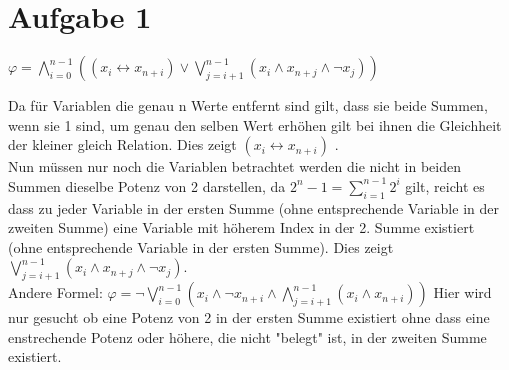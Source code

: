 \section*{Aufgabe 1}


$\varphi = \bigwedge_{i=0}^{n-1}((x_i \leftrightarrow x_{n+i}) \vee \bigvee_{j=i+1}^{n-1}( x_i \wedge x_{n+j} \wedge \neg x_{j}))$ 



Da für Variablen die genau n Werte entfernt sind gilt, dass sie beide Summen, wenn sie 1 sind, um genau den selben Wert erhöhen gilt bei ihnen die Gleichheit der kleiner gleich Relation. Dies zeigt $(x_i \leftrightarrow x_{n+i})$ .\\


Nun müssen nur noch die Variablen betrachtet werden die nicht in beiden Summen dieselbe Potenz von 2 darstellen, da $2^n-1 = \sum_{i=1}^{n-1}2^i$ gilt, reicht es dass zu jeder Variable in der ersten Summe (ohne entsprechende Variable in der zweiten Summe)  eine Variable mit höherem Index in der 2. Summe  existiert (ohne entsprechende Variable in der ersten Summe).
Dies zeigt $ \bigvee_{j=i+1}^{n-1}( x_i \wedge x_{n+j} \wedge \neg x_{j})$. \\



Andere Formel: $ \varphi = \neg \bigvee_{i=0}^{n-1}(x_i \wedge \neg x_{n+i} \wedge \bigwedge_{j=i+1}^{n-1} (x_i \wedge x_{n+i}))$ 
Hier wird nur gesucht ob eine Potenz von 2 in der ersten Summe existiert ohne dass eine enstrechende Potenz oder höhere, die nicht "belegt" ist, in der zweiten Summe existiert.